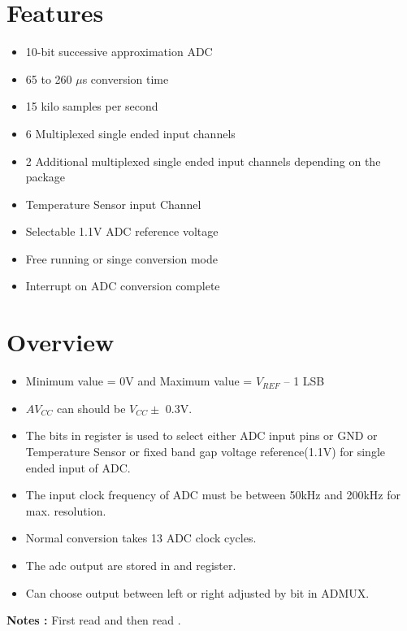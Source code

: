 \documentclass{article}
\begin{document}

\section{Features}
\begin{itemize}
    \item 10-bit successive approximation ADC
    \item 65 to 260 $\mu$s conversion time
    \item 15 kilo samples per second
    \item 6 Multiplexed single ended input channels
    \item 2 Additional multiplexed single ended input channels depending on the package
    \item Temperature Sensor input Channel
    \item Selectable 1.1V ADC reference voltage
    \item Free running or singe conversion mode
    \item Interrupt on ADC conversion complete
\end{itemize}
\section{Overview}
\begin{itemize}
    \item Minimum value = 0V and Maximum value = $V_{REF}$ – 1 LSB
    \item $AV_{CC}$ can should be $V_{CC} \pm$ 0.3V.
    \item The  bits in  register is used to select either ADC input pins or GND or Temperature Sensor or fixed band gap voltage reference(1.1V) for single ended input of ADC.
    \item The input clock frequency of ADC must be between 50kHz and 200kHz for max. resolution.
    \item Normal conversion takes 13 ADC clock cycles.
    \item The adc output are stored in  and  register.
    \item Can choose output between left or right adjusted by  bit in ADMUX.
\end{itemize}

\textbf{Notes :} First read  and then read .
\end{document}
